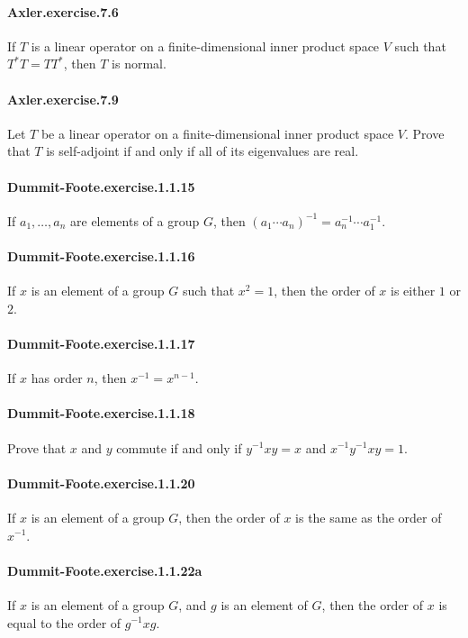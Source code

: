 \documentclass{article}
\begin{document}
\paragraph{Axler.exercise.7.6} If $T$ is a linear operator on a finite-dimensional inner product space $V$ such that $T^*T=TT^*$, then $T$ is normal.

\paragraph{Axler.exercise.7.9} Let $T$ be a linear operator on a finite-dimensional inner product space $V$. Prove that $T$ is self-adjoint if and only if all of its eigenvalues are real.

\paragraph{Dummit-Foote.exercise.1.1.15} If $a_1, \dots, a_n$ are elements of a group $G$, then $(a_1\cdots a_n)^{-1} = a_n^{-1}\cdots a_1^{-1}$.

\paragraph{Dummit-Foote.exercise.1.1.16} If $x$ is an element of a group $G$ such that $x^2=1$, then the order of $x$ is either $1$ or $2$.

\paragraph{Dummit-Foote.exercise.1.1.17} If $x$ has order $n$, then $x^{-1}=x^{n-1}$.

\paragraph{Dummit-Foote.exercise.1.1.18} Prove that $x$ and $y$ commute if and only if $y^{-1}xy=x$ and $x^{-1}y^{-1}xy=1$.

\paragraph{Dummit-Foote.exercise.1.1.20} If $x$ is an element of a group $G$, then the order of $x$ is the same as the order of $x^{-1}$.

\paragraph{Dummit-Foote.exercise.1.1.22a} If $x$ is an element of a group $G$, and $g$ is an element of $G$, then the order of $x$ is equal to the order of $g^{-1}xg$.
\end{document}
